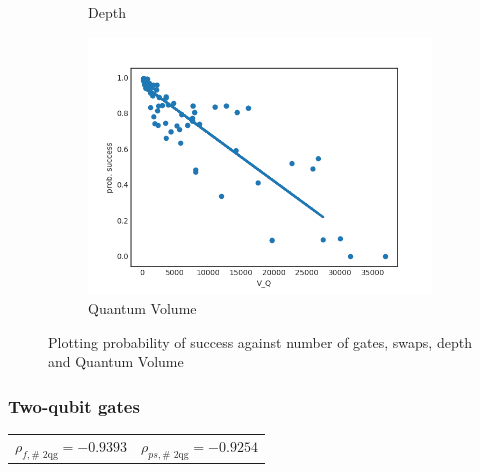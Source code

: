 \documentclass[11pt]{article}
\begin{document}
\begin{figure}[H]
\begin{subfigure}[b]{0.5\linewidth}
    \caption{Depth} 
    \label{fig:ps_d_3000} 
  \end{subfigure}%
  \begin{subfigure}[b]{0.5\linewidth}
    \centering
    \includegraphics[width=0.75\linewidth]{ps_q_3000_0_005} 
    \caption{Quantum Volume} 
    \label{fig:ps_q_3000} 
  \end{subfigure} 
  \caption{Plotting probability of success against number of gates, swaps, depth and Quantum Volume}
  \label{fig:ps_3000} 
\end{figure}




\subsubsection{Two-qubit gates}
\label{sec:org4a3a95f}

\begin{center}
\begin{tabular}{ll}
\(\rho _{f,\text{# 2qg}} = -0.9393\) & \(\rho _{ps,\text{# 2qg}} = -0.9254\)\\
\end{tabular}
\end{center}
\end{document}
